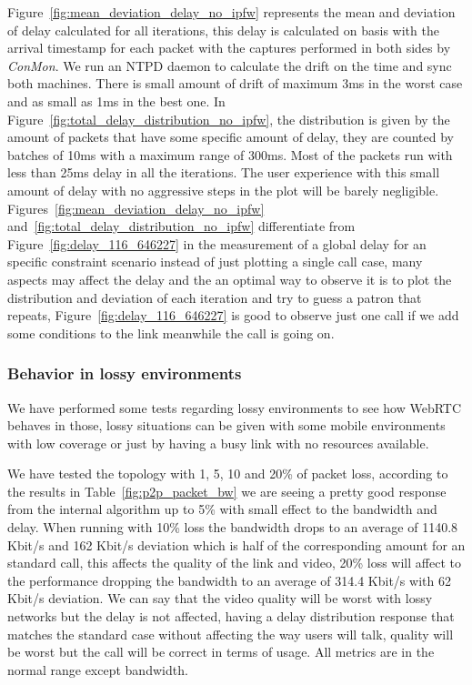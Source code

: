 Figure~\ref{fig:mean_deviation_delay_no_ipfw} represents the mean and deviation of delay calculated for all iterations, this delay is calculated on basis with the arrival timestamp for each packet with the captures performed in both sides by {\it ConMon}. We run an NTPD daemon to calculate the drift on the time and sync both machines.  There is small amount of drift of maximum 3ms in the worst case and as small as 1ms in the best one. In Figure~\ref{fig:total_delay_distribution_no_ipfw}, the distribution is given by the amount of packets that have some specific amount of delay, they are counted by batches of 10ms with a maximum range of 300ms. Most of the packets run with less than 25ms delay in all the iterations. The user experience with this small amount of delay with no aggressive steps in the plot will be barely negligible. Figures~\ref{fig:mean_deviation_delay_no_ipfw} and~\ref{fig:total_delay_distribution_no_ipfw} differentiate from Figure~\ref{fig:delay_116_646227} in the measurement of a global delay for an specific constraint scenario instead of just plotting a single call case, many aspects may affect the delay and the an optimal way to observe it is to plot the distribution and deviation of each iteration and try to guess a patron that repeats, Figure~\ref{fig:delay_116_646227} is good to observe just one call if we add some conditions to the link meanwhile the call is going on.

\subsubsection{Behavior in lossy environments}

We have performed some tests regarding lossy environments to see how WebRTC behaves in those, lossy situations can be given with some mobile environments with low coverage or just by having a busy link with no resources available.

We have tested the topology with 1, 5, 10 and 20\% of packet loss, according to the results in Table~\ref{fig:p2p_packet_bw} we are seeing a pretty good response from the internal algorithm up to 5\% with small effect to the bandwidth and delay. When running with 10\% loss the bandwidth drops to an average of 1140.8 Kbit/s and 162 Kbit/s deviation which is half of the corresponding amount for an standard call, this affects the quality of the link and video, 20\% loss will affect to the performance dropping the bandwidth to an average of 314.4 Kbit/s with 62 Kbit/s deviation. We can say that the video quality will be worst with lossy networks but the delay is not affected, having a delay distribution response that matches the standard case without affecting the way users will talk, quality will be worst but the call will be correct in terms of usage. All metrics are in the normal range except bandwidth.

